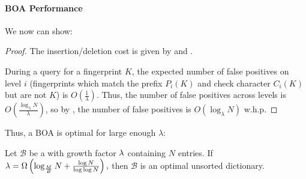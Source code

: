 \paragraph{BOA Performance}
We now can show:

\boacost*

\begin{proof}
	The insertion/deletion cost is given by 
	and .

	During a query for a fingerprint $K$, the expected number of false positives 
	on level $i$ (fingerprints which match the prefix $P_i(K)$ and check
	character $C_i(K)$ but are not $K$) is $O\left(\frac{1}{\lambda}\right)$.
	Thus, the number of false positives across levels is
	$O\left(\frac{\log_\lambda N}{\lambda}\right)$, so by ,
	the number of false positives is $O\left(\log_\lambda N\right)$ w.h.p.
\end{proof}

Thus, a BOA is optimal for large enough $\lambda$:

\begin{corollary}
	Let $\mathcal{B}$ be a \boa{} with growth factor $\lambda$ containing $N$
	entries. If $\lambda = \Omega\left(\log_\frac{M}{B}{N} +
	\frac{\log{N}}{\log\log{N}}\right),$ then $\mathcal{B}$ is an optimal
	unsorted dictionary.
\end{corollary}
